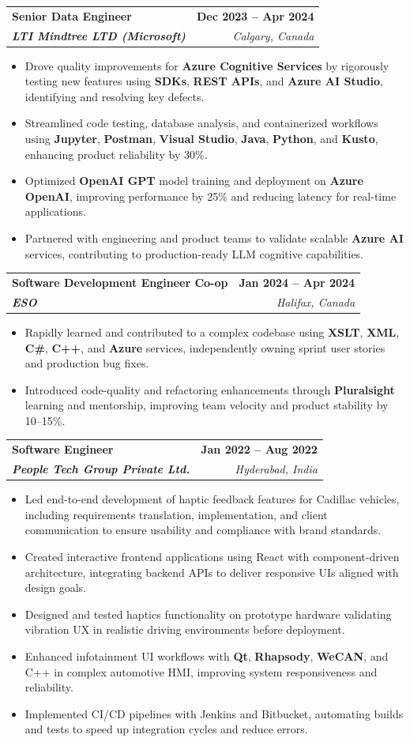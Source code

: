 \documentclass[letterpaper,11pt]{article}
\makeatletter
\newcommand{\resumeItem}[1]{
  \item\small{
    {#1 \vspace{-2pt}}
  }
}
\newcommand{\resumeSubheading}[4]{
  \vspace{-2pt}\item
    \begin{tabular*}{1.0\textwidth}[t]{l@{\extracolsep{\fill}}r}
      \textbf{#1} & \textbf{\small #2} \\
      \textit{\small#3} & \textit{\small #4} \\
    \end{tabular*}\vspace{-7pt}
}
\newcommand{\resumeItemListStart}{\begin{itemize}}
\newcommand{\resumeItemListEnd}{\end{itemize}\vspace{-5pt}}
\makeatother
\begin{document}
    \resumeSubheading
      {\textbf{Senior Data Engineer}}{\textbf{Dec 2023 -- Apr 2024}}
      {\textbf{LTI Mindtree LTD (Microsoft)}}{Calgary, Canada}
      \resumeItemListStart
        \resumeItem{Drove quality improvements for \textbf{Azure Cognitive Services} by rigorously testing new features using \textbf{SDKs}, \textbf{REST APIs}, and \textbf{Azure AI Studio}, identifying and resolving key defects.}
        \resumeItem{Streamlined code testing, database analysis, and containerized workflows using \textbf{Jupyter}, \textbf{Postman}, \textbf{Visual Studio}, \textbf{Java}, \textbf{Python}, and \textbf{Kusto}, enhancing product reliability by 30\%.}
        \resumeItem{Optimized \textbf{OpenAI GPT} model training and deployment on \textbf{Azure OpenAI}, improving performance by 25\% and reducing latency for real-time applications.}
        \resumeItem{Partnered with engineering and product teams to validate scalable \textbf{Azure AI} services, contributing to production-ready LLM cognitive capabilities.}
      \resumeItemListEnd
    
    \resumeSubheading
      {\textbf{Software Development Engineer Co-op}}{\textbf{Jan 2024 -- Apr 2024}}
      {\textbf{ESO}}{Halifax, Canada}
      \resumeItemListStart
        \resumeItem{Rapidly learned and contributed to a complex codebase using \textbf{XSLT}, \textbf{XML}, \textbf{C\#}, \textbf{C++}, and \textbf{Azure} services, independently owning sprint user stories and production bug fixes.}
        \resumeItem{Introduced code-quality and refactoring enhancements through \textbf{Pluralsight} learning and mentorship, improving team velocity and product stability by 10--15\%.}
      \resumeItemListEnd

    \resumeSubheading
      {\textbf{Software Engineer}}{\textbf{Jan 2022 -- Aug 2022}}
      {\textbf{People Tech Group Private Ltd.}}{Hyderabad, India}
      \resumeItemListStart
        \resumeItem{Led end-to-end development of haptic feedback features for Cadillac vehicles, including requirements translation, implementation, and client communication to ensure usability and compliance with brand standards.}
        \resumeItem{Created interactive frontend applications using React with component-driven architecture, integrating backend APIs to deliver responsive UIs aligned with design goals.}
        \resumeItem{Designed and tested haptics functionality on prototype hardware validating vibration UX in realistic driving environments before deployment.}
        \resumeItem{Enhanced infotainment UI workflows with \textbf{Qt}, \textbf{Rhapsody}, \textbf{WeCAN}, and C++ in complex automotive HMI, improving system responsiveness and reliability.}
        \resumeItem{Implemented CI/CD pipelines with Jenkins and Bitbucket, automating builds and tests to speed up integration cycles and reduce errors.}
      \resumeItemListEnd
\end{document}
